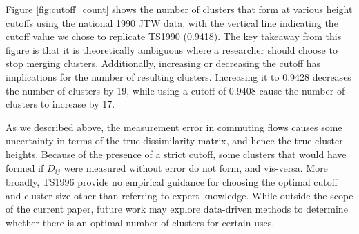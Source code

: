 Figure \ref{fig:cutoff_count} shows the number of clusters that form at various height cutoffs using the national 1990 JTW data, with the vertical line indicating the cutoff value we chose to replicate TS1990 (0.9418). The key takeaway from this figure is that it is theoretically ambiguous where a researcher should choose to stop merging clusters. Additionally, increasing or decreasing the cutoff has implications for the number of resulting clusters. Increasing it to 0.9428 decreases the number of clusters by 19, while using a cutoff of 0.9408 cause the number of clusters to increase by 17.

As we described above, the measurement error in commuting flows causes some uncertainty in terms of the true dissimilarity matrix, and hence the true cluster heights. Because of the presence of a strict cutoff, some clusters that would have formed if $D_{ij}$ were measured without error do not form, and vis-versa. More broadly, TS1996 provide no empirical guidance for choosing the optimal cutoff and cluster size other than referring to expert knowledge. While outside the scope of the current paper, future work may explore data-driven methods to determine whether there is an optimal number of clusters for certain uses.
